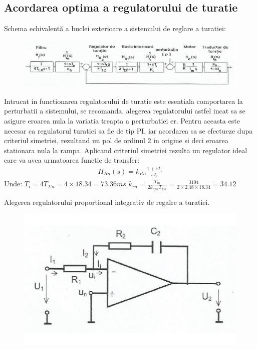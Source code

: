 \documentclass[11pt]{article}
\begin{document}
\subsection{Acordarea optima a regulatorului de turatie}
Schema echivalentă a buclei exterioare a sistemului de reglare a turatiei:
\begin{figure}[H]
	\centering
	\includegraphics[width=.9\linewidth]{fig17.png}
	\label{fig:test2}
\end{figure}
Intrucat in functionarea regulatorului de turatie este esentiala comportarea la perturbatii a sistemului, se recomanda. alegerea regulatorului astfel incat sa se asigure eroarea nula la variatia treapta a perturbatiei er. Pentru aceasta este necesar ca regulatorul turatiei sa fie de tip PI, iar acordarea sa se efectueze dupa criteriul simetriei, rezultand un pol de ordinul 2 in origine si deci eroarea stationara nula la rampa. Aplicand criteriul simetriei rezulta un regulator ideal care va avea urmatoarea functie de transfer:
\begin{align*}
H_{Rn}(s)=k_{Rn}\frac{1+sT_i}{sT_i}
\end{align*}
Unde:
$T_i=4T_{\Sigma n}=4\times 18.34=73.36ms$
$k_{rn}=\frac{T_m}{2k_{exn}T_{\Sigma n}}=\frac{3104}{2\times 2.48 
\times 18.34}=34.12$

Alegerea regulatorului proportional integrativ de regalre a turatiei.
\begin{figure}[H]
	\centering
	\includegraphics[width=.5\linewidth]{fig18.png}
	\label{fig:test2}
\end{figure}

\newpage
\nocite{*}


\end{document}
